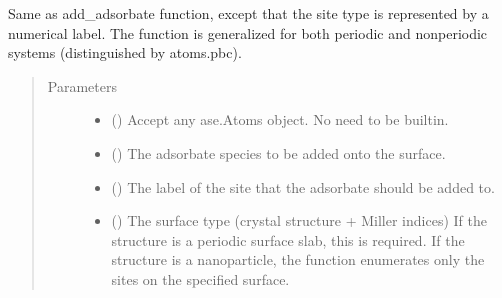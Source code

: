 \documentclass[letterpaper,10pt,english]{sphinxmanual}
\begin{document}
\begin{fulllineitems}
\label{\detokenize{build:acat.build.actions.add_adsorbate_to_label}}
Same as add\_adsorbate function, except that the site type is
represented by a numerical label. The function is generalized for
both periodic and non\sphinxhyphen{}periodic systems (distinguished by atoms.pbc).
\begin{quote}\begin{description}
\item[{Parameters}] \leavevmode\begin{itemize}
\item {} 
 () \textendash{} Accept any ase.Atoms object. No need to be built\sphinxhyphen{}in.

\item {} 
 () \textendash{} The adsorbate species to be added onto the surface.

\item {} 
 () \textendash{} The label of the site that the adsorbate should be added to.

\item {} 
 (\sphinxstyleliteralemphasis{\sphinxupquote{, }}) \textendash{} The surface type (crystal structure + Miller indices)
If the structure is a periodic surface slab, this is required.
If the structure is a nanoparticle, the function enumerates
only the sites on the specified surface.


\end{itemize}
\end{description}
\end{quote}
\end{fulllineitems}
\end{document}
